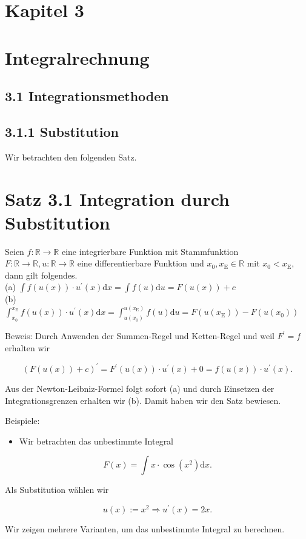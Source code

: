 \documentclass[10pt]{article}
\begin{document}
\section*{Kapitel 3}
\section*{Integralrechnung}
\subsection*{3.1 Integrationsmethoden}
\subsection*{3.1.1 Substitution}
Wir betrachten den folgenden Satz.

\section*{Satz 3.1 Integration durch Substitution}
Seien $f: \mathbb{R} \rightarrow \mathbb{R}$ eine integrierbare Funktion mit Stammfunktion $F: \mathbb{R} \rightarrow \mathbb{R}, u: \mathbb{R} \rightarrow \mathbb{R}$ eine differentierbare Funktion und $x_{0}, x_{\mathrm{E}} \in \mathbb{R}$ mit $x_{0}<x_{\mathrm{E}}$, dann gilt folgendes.\\
(a) $\int f(u(x)) \cdot u^{\prime}(x) \mathrm{d} x=\int f(u) \mathrm{d} u=F(u(x))+c$\\
(b) $\int_{x_{0}}^{x_{\mathrm{E}}} f(u(x)) \cdot u^{\prime}(x) \mathrm{d} x=\int_{u\left(x_{0}\right)}^{u\left(x_{\mathrm{E}}\right)} f(u) \mathrm{d} u=F\left(u\left(x_{\mathrm{E}}\right)\right)-F\left(u\left(x_{0}\right)\right)$

Beweis: Durch Anwenden der Summen-Regel und Ketten-Regel und weil $F^{\prime}=f$ erhalten wir


\begin{equation*}
(F(u(x))+c)^{\prime}=F^{\prime}(u(x)) \cdot u^{\prime}(x)+0=f(u(x)) \cdot u^{\prime}(x) . \tag{3.1}
\end{equation*}


Aus der Newton-Leibniz-Formel folgt sofort (a) und durch Einsetzen der Integrationsgrenzen erhalten wir (b). Damit haben wir den Satz bewiesen.

Beispiele:

\begin{itemize}
  \item Wir betrachten das unbestimmte Integral
\end{itemize}


\begin{equation*}
F(x)=\int x \cdot \cos \left(x^{2}\right) \mathrm{d} x . \tag{3.2}
\end{equation*}


Als Substitution wählen wir


\begin{equation*}
u(x):=x^{2} \Rightarrow u^{\prime}(x)=2 x . \tag{3.3}
\end{equation*}


Wir zeigen mehrere Varianten, um das unbestimmte Integral zu berechnen.
\end{document}
